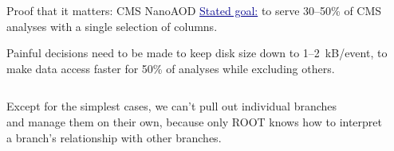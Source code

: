 \documentclass[aspectratio=169]{beamer}
\begin{document}
\begin{frame}{Proof that it matters: CMS NanoAOD}
\vspace{0.5 cm}
\textcolor{darkblue}{\underline{Stated goal:}} {to serve 30--50\% of CMS analyses with a single selection of columns.}

\vspace{0.5 cm}
Painful decisions need to be made to keep disk size down to 1--2~kB/event, to make data access faster for 50\% of analyses while excluding others.

\vspace{0.5 cm}
\begin{columns}
\begin{center}
\end{center}

\begin{center}
\end{center}
\end{columns}
\end{frame}

\begin{frame}{}
\vspace{0.5 cm}
\begin{center}
\large Except for the simplest cases, we can't pull out individual branches \\ and manage them on their own, because only ROOT knows how to interpret \\ a branch's relationship with other branches.

\vspace{1 cm}
\end{center}
\end{frame}
\end{document}
